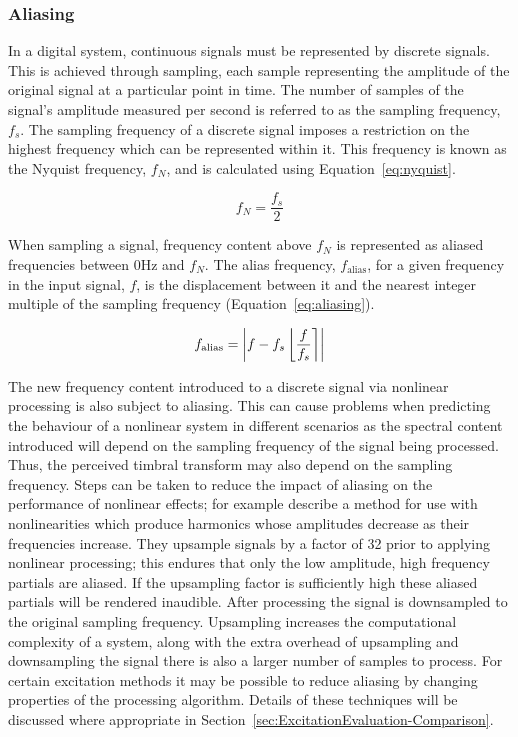 		\subsubsection*{Aliasing}
			In a digital system, continuous signals must be represented by discrete signals. This is achieved
			through sampling, each sample representing the amplitude of the original signal at a particular
			point in time. The number of samples of the signal's amplitude measured per second is referred to
			as the sampling frequency, $f_{s}$. The sampling frequency of a discrete signal imposes a
			restriction on the highest frequency which can be represented within it. This frequency is known as
			the Nyquist frequency, $f_{N}$, and is calculated using Equation~\ref{eq:nyquist}.

			\begin{equation}
				f_{N} = \frac{f_{s}}{2}
				\label{eq:nyquist}
			\end{equation}

			When sampling a signal, frequency content above $f_{N}$ is represented as aliased frequencies
			between 0Hz and $f_{N}$. The alias frequency, $f_{\mathrm{alias}}$, for a given frequency in the
			input signal, $f$, is the displacement between it and the nearest integer multiple of the sampling
			frequency (Equation~\ref{eq:aliasing}).

			\begin{equation}
				f_{\mathrm{alias}} = \left|f - f_{s}\left\lfloor\frac{f}{f_{s}}\right\rceil\right|
				\label{eq:aliasing}
			\end{equation}

			The new frequency content introduced to a discrete signal via nonlinear processing is also subject
			to aliasing. This can cause problems when predicting the behaviour of a nonlinear system in
			different scenarios as the spectral content introduced will depend on the sampling frequency of the
			signal being processed. Thus, the perceived timbral transform may also depend on the sampling
			frequency. Steps can be taken to reduce the impact of aliasing on the performance of nonlinear
			effects; for example \citep{vetter2013estimation} describe a method for use with nonlinearities
			which produce harmonics whose amplitudes decrease as their frequencies increase. They upsample
			signals by a factor of 32 prior to applying nonlinear processing; this endures that only the low
			amplitude, high frequency partials are aliased. If the upsampling factor is sufficiently high these
			aliased partials will be rendered inaudible. After processing the signal is downsampled to the
			original sampling frequency. Upsampling increases the computational complexity of a system, along
			with the extra overhead of upsampling and downsampling the signal there is also a larger number of
			samples to process. For certain excitation methods it may be possible to reduce aliasing by
			changing properties of the processing algorithm. Details of these techniques will be discussed
			where appropriate in Section~\ref{sec:ExcitationEvaluation-Comparison}.

